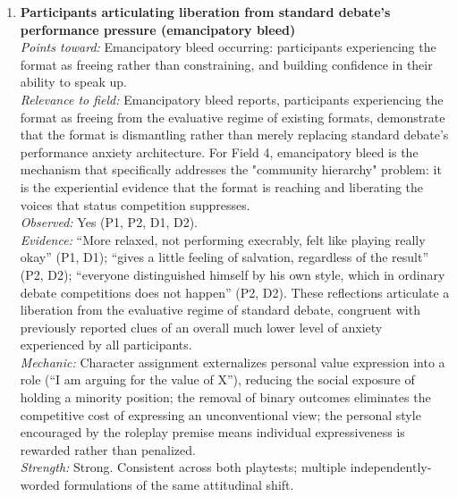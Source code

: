 \documentclass[12pt]{article}
\begin{document}
\begin{enumerate}
\item \textbf{Participants articulating liberation from standard debate's performance pressure (emancipatory bleed)}\\
\textit{Points toward:} Emancipatory bleed occurring: participants experiencing the format as freeing rather than constraining, and building confidence in their ability to speak up.\\
\textit{Relevance to field:} Emancipatory bleed reports, participants experiencing the format as freeing from the evaluative regime of existing formats, demonstrate that the format is dismantling rather than merely replacing standard debate's performance anxiety architecture. For Field 4, emancipatory bleed is the mechanism that specifically addresses the "community hierarchy" problem: it is the experiential evidence that the format is reaching and liberating the voices that status competition suppresses.\\
\textit{Observed:} Yes (P1, P2, D1, D2).\\
\textit{Evidence:} ``More relaxed, not performing execrably, felt like playing really okay'' (P1, D1); ``gives a little feeling of salvation, regardless of the result'' (P2, D2); ``everyone distinguished himself by his own style, which in ordinary debate competitions does not happen'' (P2, D2). These reflections articulate a liberation from the evaluative regime of standard debate, congruent with previously reported clues of an overall much lower level of anxiety experienced by all participants.\\
\textit{Mechanic:} Character assignment externalizes personal value expression into a role (``I am arguing for the value of X''), reducing the social exposure of holding a minority position; the removal of binary outcomes eliminates the competitive cost of expressing an unconventional view; the personal style encouraged by the roleplay premise means individual expressiveness is rewarded rather than penalized.\\
\textit{Strength:} Strong. Consistent across both playtests; multiple independently-worded formulations of the same attitudinal shift.


\end{enumerate}
\end{document}
